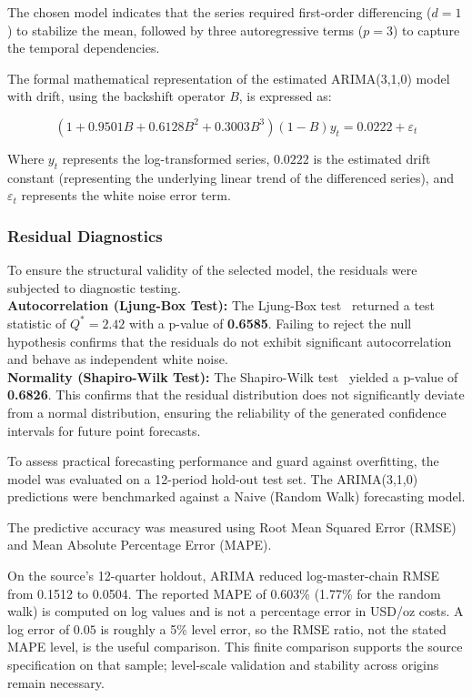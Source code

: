 The chosen model indicates that the series required first-order differencing ($d=1$) to stabilize the mean, followed by three autoregressive terms ($p=3$) to capture the temporal dependencies. 

The formal mathematical representation of the estimated ARIMA(3,1,0) model with drift, using the backshift operator $B$, is expressed as:

$$(1 + 0.9501B + 0.6128B^2 + 0.3003B^3)(1 - B)y_t = 0.0222 + \varepsilon_t$$

Where $y_t$ represents the log-transformed series, $0.0222$ is the estimated drift constant (representing the underlying linear trend of the differenced series), and $\varepsilon_t$ represents the white noise error term.
\subsubsection{Residual Diagnostics}
To ensure the structural validity of the selected model, the residuals were subjected to diagnostic testing. \\
 \textbf{Autocorrelation (Ljung-Box Test):} The Ljung-Box test~\cite{LjungBox1978} returned a test statistic of $Q^* = 2.42$ with a p-value of \textbf{0.6585}. Failing to reject the null hypothesis confirms that the residuals do not exhibit significant autocorrelation and behave as independent white noise. \\
\textbf{Normality (Shapiro-Wilk Test):} The Shapiro-Wilk test~\cite{ShapiroWilk1965} yielded a p-value of \textbf{0.6826}. This confirms that the residual distribution does not significantly deviate from a normal distribution, ensuring the reliability of the generated confidence intervals for future point forecasts.


To assess practical forecasting performance and guard against overfitting, the model was evaluated on a 12-period hold-out test set. The ARIMA(3,1,0) predictions were benchmarked against a Naive (Random Walk) forecasting model. 

The predictive accuracy was measured using Root Mean Squared Error (RMSE) and Mean Absolute Percentage Error (MAPE). 



On the source's 12-quarter holdout, ARIMA reduced log-master-chain RMSE from 0.1512 to 0.0504. The reported MAPE of 0.603\% (1.77\% for the random walk) is computed on log values and is not a percentage error in USD/oz costs. A log error of $0.05$ is roughly a 5\% level error, so the RMSE ratio, not the stated MAPE level, is the useful comparison. This finite comparison supports the source specification on that sample; level-scale validation and stability across origins remain necessary.

